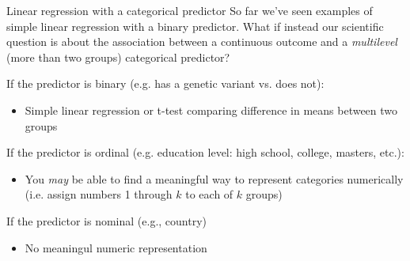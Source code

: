 \documentclass[10pt,t]{beamer}
\begin{document}
\begin{frame}{Linear regression with a categorical predictor}
So far we've seen examples of simple linear regression with a binary predictor. What if instead our scientific question is about the association between a continuous outcome and a \textit{multilevel} (more than two groups) categorical predictor? \pause

\vspace{0.3cm}

If the predictor is binary (e.g. has a genetic variant vs. does not):
\begin{itemize}
	\item Simple linear regression or t-test comparing difference in means between two groups
\end{itemize} \pause

\vspace{0.3cm}

If the predictor is ordinal (e.g. education level: high school, college, masters, etc.):
\begin{itemize}
	\item You \textit{may} be able to find a meaningful way to represent categories numerically (i.e. assign numbers 1 through $k$ to each of $k$ groups)
\end{itemize} \pause

\vspace{0.3cm}

If the predictor is nominal (e.g., country)
\begin{itemize}
	\item No meaningul numeric representation
\end{itemize}

\end{frame}
\end{document}
